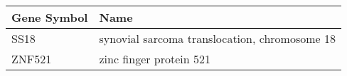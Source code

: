 \begin{tabular}{ll}
\toprule
Gene Symbol &                                          Name \\
\midrule
       SS18 & synovial sarcoma translocation, chromosome 18 \\
     ZNF521 &                       zinc finger protein 521 \\
\bottomrule
\end{tabular}

